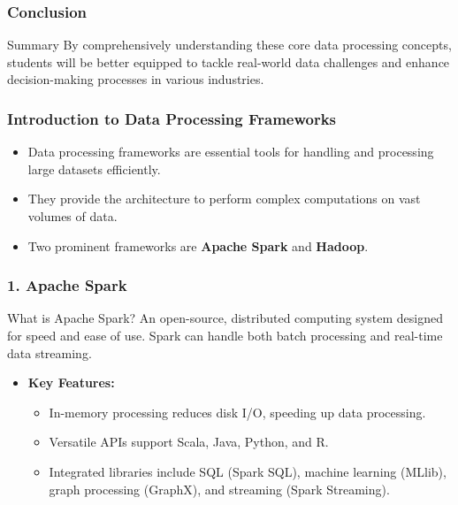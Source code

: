 \documentclass[aspectratio=169]{beamer}
\begin{document}
\begin{frame}[fragile]
    \frametitle{Conclusion}
    \begin{block}{Summary}
        By comprehensively understanding these core data processing concepts, students will be better equipped to tackle real-world data challenges and enhance decision-making processes in various industries.
    \end{block}
\end{frame}

\begin{frame}
    \titlepage
\end{frame}

\begin{frame}[fragile]
    \frametitle{Introduction to Data Processing Frameworks}
    \begin{itemize}
        \item Data processing frameworks are essential tools for handling and processing large datasets efficiently.
        \item They provide the architecture to perform complex computations on vast volumes of data.
        \item Two prominent frameworks are \textbf{Apache Spark} and \textbf{Hadoop}.
    \end{itemize}
\end{frame}

\begin{frame}[fragile]
    \frametitle{1. Apache Spark}
    \begin{block}{What is Apache Spark?}
        An open-source, distributed computing system designed for speed and ease of use. Spark can handle both batch processing and real-time data streaming.
    \end{block}
    \begin{itemize}
        \item \textbf{Key Features:}
        \begin{itemize}
            \item In-memory processing reduces disk I/O, speeding up data processing.
            \item Versatile APIs support Scala, Java, Python, and R.
            \item Integrated libraries include SQL (Spark SQL), machine learning (MLlib), graph processing (GraphX), and streaming (Spark Streaming).
        \end{itemize}
    \end{itemize}
\end{frame}
\end{document}
